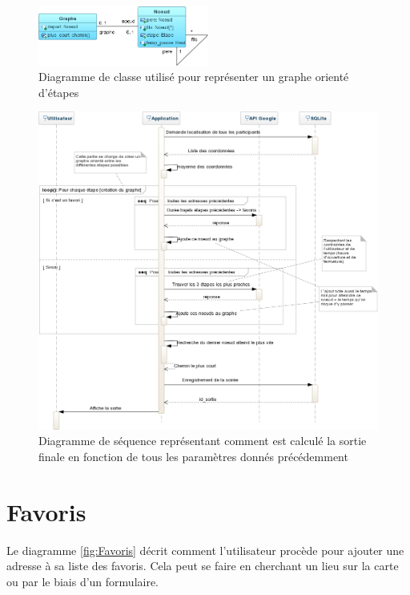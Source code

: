 \documentclass[a4paper, 12pt, notitlepage]{article} %
\begin{document}
\vfill
\begin{figure}[!htb]
    \centering
    \includegraphics[width=0.5\textwidth]{Diagramme_de_classe_graphe.png}
    \caption[Diagramme de classe du graphe]{Diagramme de classe utilisé pour représenter un graphe orienté d'étapes}
    \label{fig:ClasseGraphe}
\end{figure}
\vfill
\vfill

\begin{figure}[!htb]
    \centering
    \includegraphics[width=1\textwidth]{Sequence_Calcul_Sortie.png}
    \caption[Diagramme de séquence de calcul de la sortie]{Diagramme de séquence représentant comment est calculé la sortie finale en fonction de tous les paramètres donnés précédemment}
    \label{fig:CalculSortie}
\end{figure}
\clearpage

\section{Favoris}
Le diagramme \ref{fig:Favoris} décrit comment l'utilisateur procède pour ajouter une adresse à sa liste des favoris. Cela peut se faire en cherchant un lieu sur la carte ou par le biais d'un formulaire.
\end{document}
